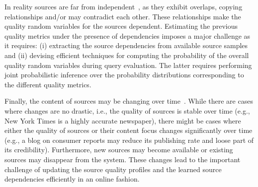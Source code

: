 \documentclass{sig-alternate}
\begin{document}
In reality sources are far from independent~\cite{berti-equille:sailing, dong:2009,pochampally:2014}, as they exhibit overlaps, copying relationships and/or may contradict each other. These relationships make the quality random variables for the sources dependent. Estimating the previous quality metrics under the presence of dependencies imposes a major challenge as it requires: (i) extracting the source dependencies from available source samples and (ii) devising efficient techniques for computing the probability of the overall quality random variables during query evaluation. The latter requires performing joint probabilistic inference over the probability distributions corresponding to the different quality metrics.

Finally, the content of sources may be changing over time~\cite{rekatsinas:2014}. While there are cases where changes are no drastic, i.e., the quality of sources is stable over time (e.g., New York Times is a highly accurate newspaper), there might be cases where either the quality of sources or their content focus changes significantly over time (e.g., a  blog on consumer reports may reduce its publishing rate and loose part of its credibility). Furthermore, new sources may become available or existing sources may disappear from the system. These changes lead to the important challenge of updating the source quality profiles and the learned source dependencies efficiently in an online fashion. 

\end{document}
